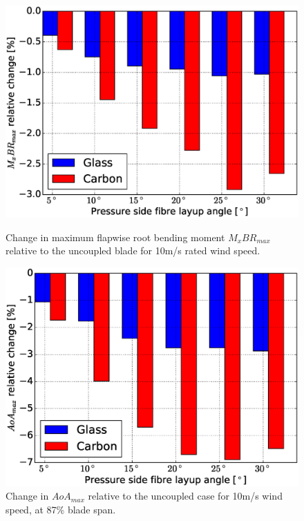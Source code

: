 \documentclass[a4paper]{jpconf}
\begin{document}
\begin{figure}[pth]
\centering
\begin{minipage}{0.35\textwidth}
\includegraphics[width=\linewidth]{Figures/Chapter4/Load/steady_relmxbr.eps}
\caption{\label{subfig:mx_rel}Change in maximum flapwise root bending moment $M_xBR_{max}$ relative to the uncoupled blade for 10m/s rated wind speed.}
\end{minipage}\hspace{0.10\textwidth}%
\begin{minipage}{0.35\textwidth}
\includegraphics[width=\linewidth]{Figures/Chapter4/Load/steady_relalpha.eps}
\caption{\label{subfig:alphacurve_rel}Change in $AoA_{max}$ relative to the uncoupled case for 10m/s wind speed, at 87\% blade span.}
\end{minipage} 
\end{figure}
\end{document}
